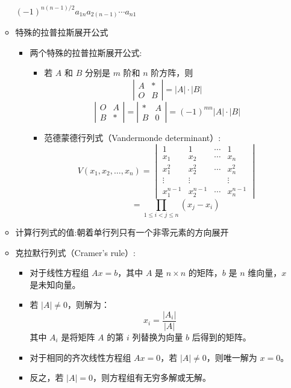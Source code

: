 \documentclass[10pt]{article}
\begin{document}
\begin{multicols}{2}
\begin{itemize}
\begin{itemize}
      \((-1)^{n(n-1)/2} a_{1n} a_{2(n-1)} \cdots a_{n1}\)
      \item 特殊的拉普拉斯展开公式
        \begin{itemize}
            \item 两个特殊的拉普拉斯展开公式:
            \begin{itemize}
              \item 若 $A$ 和 $B$ 分别是 $m$ 阶和 $n$ 阶方阵，则
              \[
                \left| \begin{matrix} A & * \\ O & B \end{matrix} \right| = |A| \cdot |B|
              \]
              \[
                \left| \begin{matrix} O & A \\ B & * \end{matrix} \right| = \left| \begin{matrix} * & A \\ B & 0 \end{matrix} \right| = (-1)^{m n} |A| \cdot |B|
              \]
                \item 范德蒙德行列式（Vandermonde determinant）:
                \[
                V(x_1, x_2, \ldots, x_n) =
                \begin{vmatrix}
                  1 & 1 & \cdots & 1 \\
                  x_1 & x_2 & \cdots & x_n \\
                  x_1^2 & x_2^2 & \cdots & x_n^2 \\
                  \vdots & \vdots & & \vdots \\
                  x_1^{n-1} & x_2^{n-1} & \cdots & x_n^{n-1}
                \end{vmatrix}
                \]
                \[
                \qquad = \prod_{1 \leq i < j \leq n} (x_j - x_i)
                \]       \end{itemize}

        \end{itemize}

      \item 计算行列式的值:朝着单行列只有一个非零元素的方向展开
      \item 克拉默行列式（Cramer's rule）:
        \begin{itemize}
          \item 对于线性方程组 \(Ax = b\)，其中 \(A\) 是 \(n \times n\) 的矩阵，\(b\) 是 \(n\) 维向量，\(x\) 是未知向量。
          \item 若 \(|A| \neq 0\)，则解为：
          \[
          x_i = \frac{|A_i|}{|A|}
          \]
          其中 \(A_i\) 是将矩阵 \(A\) 的第 \(i\) 列替换为向量 \(b\) 后得到的矩阵。
          \item 对于相同的齐次线性方程组 \(Ax = 0\)，若 \(|A| \neq 0\)，则唯一解为 \(x = 0\)。
          \item 反之，若 \(|A| = 0\)，则方程组有无穷多解或无解。
        \end{itemize}
    \end{itemize}


\end{itemize}
\end{multicols}
\end{document}
